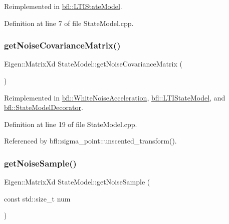 Reimplemented in \mbox{\hyperlink{classbfl_1_1LTIStateModel_a5bdef1421c100bce7baa1961d2916fc3}{bfl\+::\+L\+T\+I\+State\+Model}}.



Definition at line 7 of file State\+Model.\+cpp.

\mbox{\label{classbfl_1_1StateModel_a423c1fa86b9d60c8663dedc6cdcae276}} 
\subsubsection{\texorpdfstring{get\+Noise\+Covariance\+Matrix()}{getNoiseCovarianceMatrix()}}
{\footnotesize\ttfamily Eigen\+::\+Matrix\+Xd State\+Model\+::get\+Noise\+Covariance\+Matrix (\begin{DoxyParamCaption}{ }\end{DoxyParamCaption})\hspace{0.3cm}{\ttfamily [virtual]}}



Reimplemented in \mbox{\hyperlink{classbfl_1_1WhiteNoiseAcceleration_a453df5960973059b35ee8686dc12ab0d}{bfl\+::\+White\+Noise\+Acceleration}}, \mbox{\hyperlink{classbfl_1_1LTIStateModel_a60a5ab5f3013b771ddd73787edd8dcde}{bfl\+::\+L\+T\+I\+State\+Model}}, and \mbox{\hyperlink{classbfl_1_1StateModelDecorator_ae70700c1fad6b788b21722e57f2d0f6b}{bfl\+::\+State\+Model\+Decorator}}.



Definition at line 19 of file State\+Model.\+cpp.



Referenced by bfl\+::sigma\+\_\+point\+::unscented\+\_\+transform().

\mbox{\label{classbfl_1_1StateModel_acc6733af2dcba2a330bf7c59c3725e42}} 
\subsubsection{\texorpdfstring{get\+Noise\+Sample()}{getNoiseSample()}}
{\footnotesize\ttfamily Eigen\+::\+Matrix\+Xd State\+Model\+::get\+Noise\+Sample (\begin{DoxyParamCaption}\item[{const std\+::size\+\_\+t}]{num }\end{DoxyParamCaption})\hspace{0.3cm}{\ttfamily [virtual]}}



